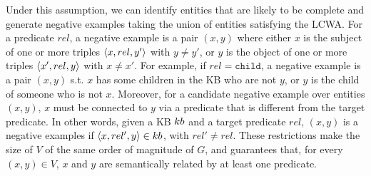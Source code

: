Under this assumption, we can identify entities that are likely to be complete and generate negative examples taking the union of entities satisfying the LCWA. For a predicate $rel$, a negative example is a pair $(x,y)$ where either $x$ is the subject of one or more triples $\langle x,rel,y'\rangle$ with $y \neq y'$, or $y$ is the object of one or more triples $\langle x',rel,y\rangle$ with $x \neq x'$. 
For example, if $rel=\texttt{child}$, a negative example is a pair $(x,y)$ s.t. $x$ has some children in the KB who are not $y$, or $y$ is the child of someone who is not $x$. %
Moreover, for a candidate negative example over entities $(x,y)$, $x$ must be connected to $y$ via a predicate that is different from the target predicate. In other words, given a KB ${\sc kb}$ and a target predicate $rel$, $(x,y)$ is a negative examples if $\langle x,rel',y\rangle \in {\sc kb}$, with $rel' \neq rel$. 
These restrictions make the size of $V$ of the same order of magnitude of $G$, %
and guarantees that, for every $(x,y) \in V$, $x$ and $y$ are semantically related by at least one predicate.



